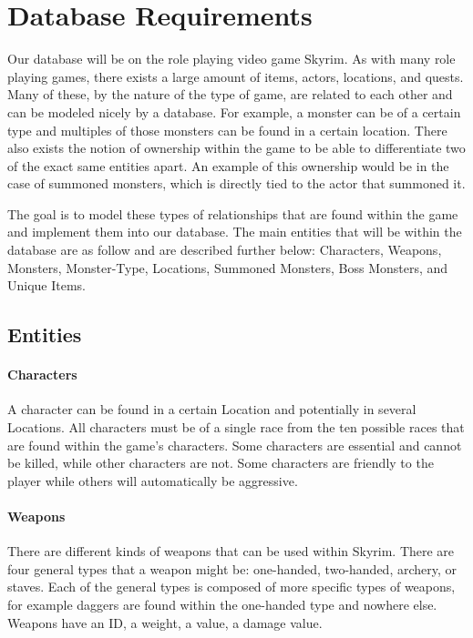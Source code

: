 \section*{Database Requirements}

Our database will be on the role playing video game Skyrim. As with many role playing games, there exists a large amount of items, actors, locations, and quests. Many of these, by the nature of the type of game, are related to each other and can be modeled nicely by a database. For example, a monster can be of a certain type and multiples of those monsters can be found in a certain location. There also exists the notion of ownership within the game to be able to differentiate two of the exact same entities apart. An example of this ownership would be in the case of summoned monsters, which is directly tied to the actor that summoned it.


The goal is to model these types of relationships that are found within the game and implement them into our database. The main entities that will be within the database are as follow and are described further below: Characters, Weapons, Monsters, Monster-Type, Locations, Summoned Monsters, Boss Monsters, and Unique Items.

\subsection*{Entities}
\paragraph{Characters}
A character can be found in a certain Location and potentially in several Locations. All characters must be of a single race from the ten possible races that are found within the game’s characters. Some characters are essential and cannot be killed, while other characters are not. Some characters are friendly to the player while others will automatically be aggressive. 

\paragraph{Weapons}
There are different kinds of weapons that can be used within Skyrim. There are four general types that a weapon might be: one-handed, two-handed, archery, or staves. Each of the general types is composed of more specific types of weapons, for example daggers are found within the one-handed type and nowhere else. Weapons have an ID, a weight, a value, a damage value.

